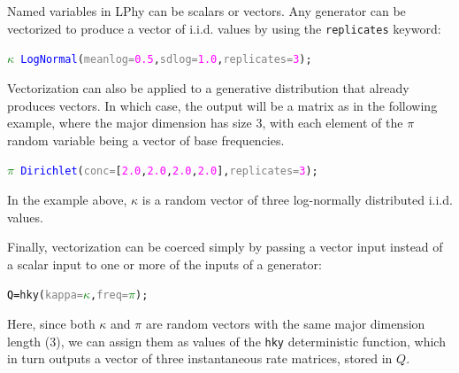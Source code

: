 \documentclass[10pt,letterpaper,table]{article}
\begin{document}
Named variables in LPhy can be scalars or vectors. Any generator can be vectorized to produce a vector of i.i.d. values by using the \texttt{replicates} keyword:

{\small
\begin{alltt}
    \textcolor{green}{\(\kappa\)} ~ \textcolor{blue}{LogNormal}(\textcolor{gray}{meanlog=}\textcolor{magenta}{0.5}, \textcolor{gray}{sdlog=}\textcolor{magenta}{1.0}, \textcolor{gray}{replicates=}\textcolor{magenta}{3});
\end{alltt}
}

Vectorization can also be applied to a generative distribution that already produces vectors. In which case, the output will be a matrix as in the following example, where the major dimension has size 3, with each element of the $\pi$ random variable being a vector of base frequencies.

{\small
\begin{alltt}
      \textcolor{green}{\(\pi\)} ~ \textcolor{blue}{Dirichlet}(\textcolor{gray}{conc=}[\textcolor{magenta}{2.0}, \textcolor{magenta}{2.0}, \textcolor{magenta}{2.0}, \textcolor{magenta}{2.0}], \textcolor{gray}{replicates=}\textcolor{magenta}{3});
\end{alltt}
}

In the example above, $\kappa$ is a random vector of three log-normally distributed i.i.d. values. 

Finally, vectorization can be coerced simply by passing a vector input instead of a scalar input to one or more of the inputs of a generator:

{\small
\begin{alltt}
    \textcolor{black}{Q = }\textcolor{magenta!80!black}{hky}(\textcolor{gray}{kappa=}\textcolor{green}{\(\kappa\)}, \textcolor{gray}{freq=}\textcolor{green}{\(\pi\)});
\end{alltt} 
}

Here, since both $\kappa$ and $\pi$ are random vectors with the same major dimension length (3), we can assign them as values of the \texttt{hky} deterministic function, which in turn outputs a vector of three instantaneous rate matrices, stored in $Q$.

\end{document}
